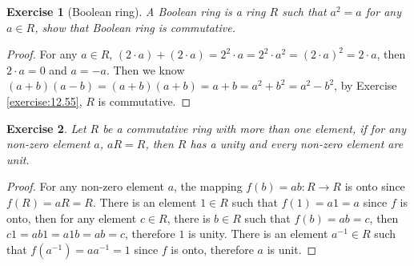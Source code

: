 \documentclass[14pt]{extarticle}
\newtheorem{exercise}{Exercise}[section]
\newcommand{\inv}[1]{#1^{-1}}
\newcommand{\1}{\{e\}}
\begin{document}
\begin{exercise}[Boolean ring]
  A Boolean ring is a ring $R$ such that $a^2 = a$ for any $a \in R$, show that
  Boolean ring is commutative.
\end{exercise}
\begin{proof}
  For any $a \in R$, $(2 \cdot a) + (2 \cdot a) = 2^2 \cdot a = 2^2 \cdot a^2 = (2 \cdot a)^2 = 2 \cdot a$,
  then $2 \cdot a = 0$ and $a = -a$. 
  Then we know $(a + b)(a - b) = (a + b)(a + b) = a + b = a^2 + b^2 = a^2 - b^2$,
  by Exercise \ref{exercise:12.55}, $R$ is commutative.
\end{proof}

\setcounter{exercise}{60}
\begin{exercise}
  Let $R$ be a commutative ring with more than one element, if
  for any non-zero element $a$, $aR = R$, then $R$ has a unity 
  and every non-zero element are unit.
\end{exercise}
\begin{proof}
  For any non-zero element $a$, the mapping $f(b) = ab : R \rightarrow R$
  is onto since $f(R) = aR = R$.
  There is an element $1 \in R$ such that $f(1) = a1 = a$ since $f$ is onto,
  then for any element $c \in R$, there is $b \in R$ such that $f(b) = ab = c$,
  then $c1 = ab1 = a1b = ab = c$, therefore $1$ is unity.
  There is an element $\inv{a} \in R$ such that $f(\inv{a}) = a\inv{a} = 1$
  since $f$ is onto, therefore $a$ is unit.
\end{proof}
\end{document}
